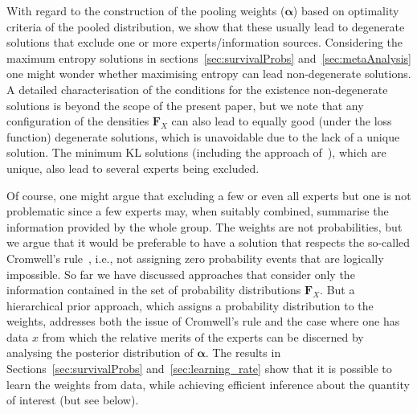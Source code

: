\documentclass[a4paper, notitlepage, 10pt]{article}
\begin{document}
With regard to the construction of the pooling weights ($\boldsymbol\alpha$) based on optimality criteria of the pooled distribution, we show that these usually lead to degenerate solutions that exclude one or more experts/information sources.
Considering the maximum entropy solutions in sections~\ref{sec:survivalProbs} and~\ref{sec:metaAnalysis} one might wonder whether maximising entropy can lead non-degenerate solutions.
A detailed characterisation of the conditions for the existence non-degenerate solutions is beyond the scope of the present paper, but we note that any configuration of the densities $\boldsymbol F_X$ can also lead to equally good (under the loss function) degenerate solutions, which is unavoidable due to the lack of a unique solution.
The minimum KL solutions (including the approach of~\citep{Rufo2012B}), which are unique, also lead to several experts being excluded.

Of course, one might argue that excluding a few or even all experts but one is not problematic since a few experts may, when suitably combined, summarise the information provided by the whole group.
The weights are not probabilities, but we argue that it would be preferable to have a solution that respects the so-called Cromwell's rule~\citep[pg. 91]{Lindley2013}, i.e., not assigning zero probability events that are logically impossible.
So far we have discussed approaches that consider only the information contained in the set of probability distributions $\boldsymbol F_X$.
But a hierarchical prior approach, which assigns a probability distribution to the weights, addresses both the issue of Cromwell's rule and the case where one has data $x$ from which the relative merits of the experts can be discerned by analysing the posterior distribution of $\boldsymbol\alpha$.
The results in Sections~\ref{sec:survivalProbs} and~\ref{sec:learning_rate} show that it is possible to learn the weights from data, while achieving efficient inference about the quantity of interest (but see below). 
\end{document}

